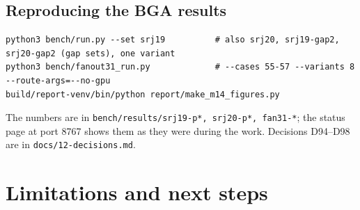 \documentclass[10pt,a4paper]{article}
\begin{document}
\subsection{Reproducing the BGA results}

\begin{small}
\begin{verbatim}
python3 bench/run.py --set srj19          # also srj20, srj19-gap2, srj20-gap2 (gap sets), one variant
python3 bench/fanout31_run.py             # --cases 55-57 --variants 8 --route-args=--no-gpu
build/report-venv/bin/python report/make_m14_figures.py
\end{verbatim}
\end{small}
The numbers are in \texttt{bench/results/srj19-p*, srj20-p*, fan31-*}; the status page at port 8767 shows them as they
were during the work. Decisions D94--D98 are in \texttt{docs/12-decisions.md}.

\section{Limitations and next steps}
\label{sec:limits}
\end{document}
